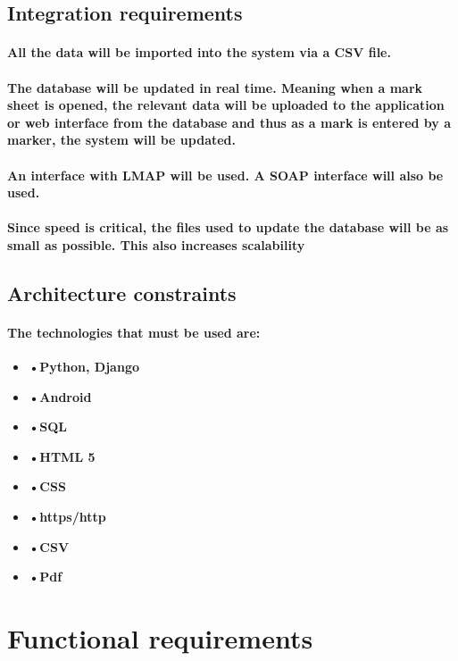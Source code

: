 \documentclass[12pt]{article}
\begin{document}
  \subsection{Integration requirements}
  \paragraph{All the data will be imported into the system via a CSV file.}
  \paragraph{The database will be updated in real time. Meaning when a mark sheet is opened, the relevant data will be uploaded to the application or web interface from the database and thus as a mark is entered by a marker, the system will be updated.}
  \paragraph{
   An interface with LMAP will be used. A SOAP interface will also be used.
  }
  \paragraph{Since speed is critical, the files used to update the database will be as small as possible. This also increases scalability}
  \subsection{Architecture constraints}
  \paragraph{
  The technologies that must be used are:
  }
  \begin{itemize}
  \item \textbf{•Python, Django}
  \item \textbf{•Android}
  \item \textbf{•SQL}
  \item \textbf{•HTML 5}
  \item \textbf{•CSS}
  \item \textbf{•https/http}
  \item \textbf{•CSV}
  \item \textbf{•Pdf}
\end{itemize}
  \section{Functional requirements}
\end{document}
